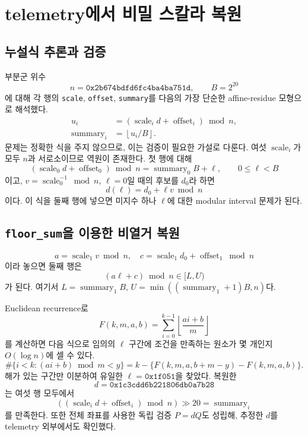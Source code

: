 \documentclass[10pt,a4paper]{article}
\begin{document}
\section{telemetry에서 비밀 스칼라 복원}

\subsection{누설식 추론과 검증}

부분군 위수
\[
  n=\texttt{0x2b674bdfd6fc4ba4ba751d},\qquad B=2^{20}
\]
에 대해 각 행의 \texttt{scale}, \texttt{offset}, \texttt{summary}를
다음의 가장 단순한 affine-residue 모형으로 해석했다.
\[
\begin{aligned}
u_i&=(\operatorname{scale}_i d+\operatorname{offset}_i)\bmod n,\\
\operatorname{summary}_i&=\left\lfloor u_i/B\right\rfloor.
\end{aligned}
\]
문제는 정확한 식을 주지 않으므로, 이는 검증이 필요한 가설로 다룬다.
여섯 \(\operatorname{scale}_i\)가 모두 \(n\)과 서로소이므로 역원이 존재한다.
첫 행에 대해
\[
 (\operatorname{scale}_0d+\operatorname{offset}_0)\bmod n
   =\operatorname{summary}_0B+\ell,\qquad 0\le\ell<B
\]
이고, \(v=\operatorname{scale}_0^{-1}\bmod n\), \(\ell=0\)일 때의 후보를
\(d_0\)라 하면
\[
 d(\ell)=d_0+\ell v\bmod n
\]
이다. 이 식을 둘째 행에 넣으면 미지수 하나 \(\ell\)에 대한 modular
interval 문제가 된다.

\subsection{\texttt{floor\_sum}을 이용한 비열거 복원}

\[
 a=\operatorname{scale}_1v\bmod n,\quad
 c=\operatorname{scale}_1d_0+\operatorname{offset}_1\bmod n
\]
이라 놓으면 둘째 행은
\[
 (a\ell+c)\bmod n\in[L,U)
\]
가 된다. 여기서 \(L=\operatorname{summary}_1B\),
\(U=\min((\operatorname{summary}_1+1)B,n)\)다.

Euclidean recurrence로
\[
 F(k,m,a,b)=\sum_{i=0}^{k-1}
  \left\lfloor\frac{ai+b}{m}\right\rfloor
\]
를 계산하면 다음 식으로 임의의 \(\ell\) 구간에 조건을 만족하는 원소가
몇 개인지 \(O(\log n)\)에 셀 수 있다.
\[
\#\{i<k:(ai+b)\bmod m<y\}
=k-\{F(k,m,a,b+m-y)-F(k,m,a,b)\}.
\]
해가 있는 구간만 이분하여 유일한
\(\ell=\texttt{0x1f051}\)을 찾았다. 복원한
\[
d=\texttt{0x1c3cdd6b221806db0a7b28}
\]
는 여섯 행 모두에서
\[
 ((\operatorname{scale}_i d+\operatorname{offset}_i)\bmod n)\gg20
  =\operatorname{summary}_i
\]
를 만족한다. 또한 전체 좌표를 사용한 독립 검증 \(P=dQ\)도 성립해, 추정한
\(d\)를 telemetry 외부에서도 확인했다.
\end{document}
